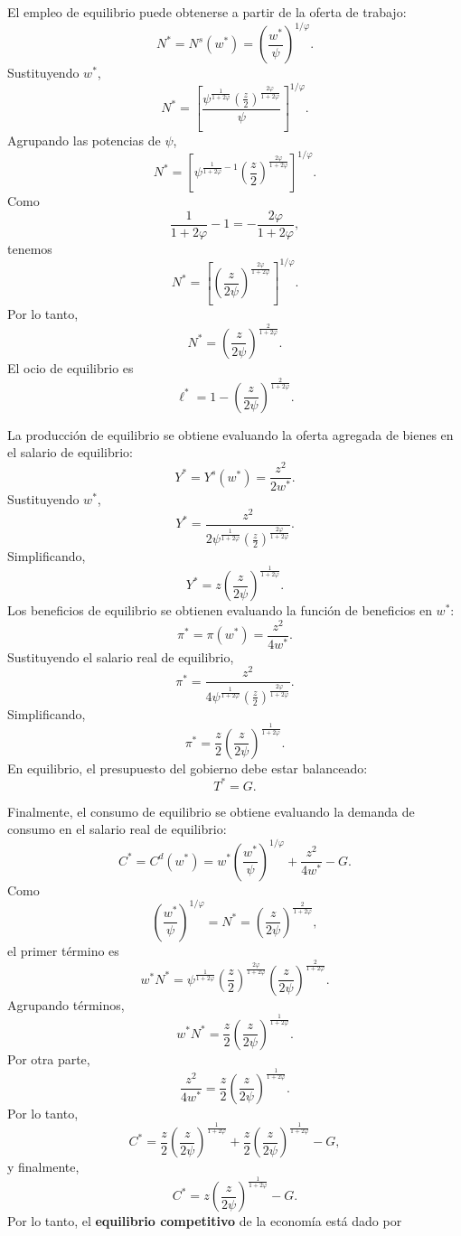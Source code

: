 \documentclass[11pt]{article}
\begin{document}
El empleo de equilibrio puede obtenerse a partir de la oferta de trabajo:
\[
N^*
=
N^s(w^*)
=
\left(
\frac{w^*}{\psi}
\right)^{1/\varphi}.
\]
Sustituyendo $w^*$,
\[
N^*
=
\left[
\frac{
\psi^{\frac{1}{1+2\varphi}}
\left(\frac{z}{2}\right)^{\frac{2\varphi}{1+2\varphi}}
}{
\psi
}
\right]^{1/\varphi}.
\]
Agrupando las potencias de $\psi$,
\[
N^*
=
\left[
\psi^{
\frac{1}{1+2\varphi}-1
}
\left(\frac{z}{2}\right)^{\frac{2\varphi}{1+2\varphi}}
\right]^{1/\varphi}.
\]
Como
\[
\frac{1}{1+2\varphi}-1
=
-\frac{2\varphi}{1+2\varphi},
\]
tenemos
\[
N^*
=
\left[
\left(
\frac{z}{2\psi}
\right)^{\frac{2\varphi}{1+2\varphi}}
\right]^{1/\varphi}.
\]
Por lo tanto,
\[
\boxed{
N^*
=
\left(
\frac{z}{2\psi}
\right)^{\frac{2}{1+2\varphi}}
}.
\]
El ocio de equilibrio es
\[
\boxed{
\ell^*
=
1-
\left(
\frac{z}{2\psi}
\right)^{\frac{2}{1+2\varphi}}
}.
\]

La producción de equilibrio se obtiene evaluando la oferta agregada de bienes en el salario de equilibrio:
\[
Y^*
=
Y^s(w^*)
=
\frac{z^2}{2w^*}.
\]
Sustituyendo $w^*$,
\[
Y^*
=
\frac{z^2}{
2
\psi^{\frac{1}{1+2\varphi}}
\left(\frac{z}{2}\right)^{\frac{2\varphi}{1+2\varphi}}
}.
\]
Simplificando,
\[
\boxed{
Y^*
=
z
\left(
\frac{z}{2\psi}
\right)^{\frac{1}{1+2\varphi}}
}.
\]
Los beneficios de equilibrio se obtienen evaluando la función de beneficios en $w^*$:
\[
\pi^*
=
\pi(w^*)
=
\frac{z^2}{4w^*}.
\]
Sustituyendo el salario real de equilibrio,
\[
\pi^*
=
\frac{z^2}{
4
\psi^{\frac{1}{1+2\varphi}}
\left(\frac{z}{2}\right)^{\frac{2\varphi}{1+2\varphi}}
}.
\]
Simplificando,
\[
\boxed{
\pi^*
=
\frac{z}{2}
\left(
\frac{z}{2\psi}
\right)^{\frac{1}{1+2\varphi}}
}.
\]
En equilibrio, el presupuesto del gobierno debe estar balanceado:
\[
\boxed{
T^*=G
}.
\]

Finalmente, el consumo de equilibrio se obtiene evaluando la demanda de consumo en el salario real de equilibrio:
\[
C^*
=
C^d(w^*)
=
w^*
\left(
\frac{w^*}{\psi}
\right)^{1/\varphi}
+
\frac{z^2}{4w^*}
-G.
\]
Como
\[
\left(
\frac{w^*}{\psi}
\right)^{1/\varphi}
=
N^*
=
\left(
\frac{z}{2\psi}
\right)^{\frac{2}{1+2\varphi}},
\]
el primer término es
\[
w^*N^*
=
\psi^{\frac{1}{1+2\varphi}}
\left(\frac{z}{2}\right)^{\frac{2\varphi}{1+2\varphi}}
\left(
\frac{z}{2\psi}
\right)^{\frac{2}{1+2\varphi}}.
\]
Agrupando términos,
\[
w^*N^*
=
\frac{z}{2}
\left(
\frac{z}{2\psi}
\right)^{\frac{1}{1+2\varphi}}.
\]
Por otra parte,
\[
\frac{z^2}{4w^*}
=
\frac{z}{2}
\left(
\frac{z}{2\psi}
\right)^{\frac{1}{1+2\varphi}}.
\]
Por lo tanto,
\[
C^*
=
\frac{z}{2}
\left(
\frac{z}{2\psi}
\right)^{\frac{1}{1+2\varphi}}
+
\frac{z}{2}
\left(
\frac{z}{2\psi}
\right)^{\frac{1}{1+2\varphi}}
-G,
\]
y finalmente,
\[
\boxed{
C^*
=
z
\left(
\frac{z}{2\psi}
\right)^{\frac{1}{1+2\varphi}}
-G
}.
\]
Por lo tanto, el \textbf{equilibrio competitivo} de la economía está dado por
\end{document}
